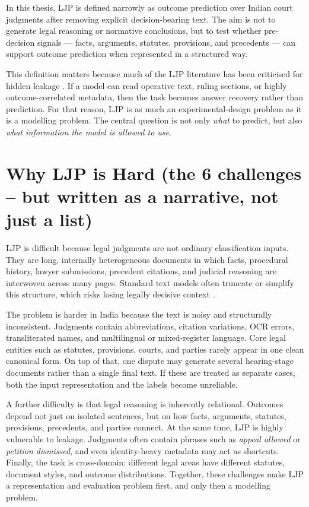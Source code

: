In this thesis, LJP is defined narrowly as outcome prediction over Indian court judgments after removing explicit decision-bearing text. The aim is not to generate legal reasoning or normative conclusions, but to test whether pre-decision signals --- facts, arguments, statutes, provisions, and precedents --- can support outcome prediction when represented in a structured way.

This definition matters because much of the LJP literature has been criticised for hidden leakage \cite{medvedeva2023doitright}. If a model can read operative text, ruling sections, or highly outcome-correlated metadata, then the task becomes answer recovery rather than prediction. For that reason, LJP is as much an experimental-design problem as it is a modelling problem. The central question is not only \emph{what} to predict, but also \emph{what information the model is allowed to use}. 

\section{Why LJP is Hard (the 6 challenges -- but written as a narrative, not just a list)}

LJP is difficult because legal judgments are not ordinary classification inputs. They are long, internally heterogeneous documents in which facts, procedural history, lawyer submissions, precedent citations, and judicial reasoning are interwoven across many pages. Standard text models often truncate or simplify this structure, which risks losing legally decisive context \cite{chalkidis2020legalbert, mamakas2022longlegal}.

The problem is harder in India because the text is noisy and structurally inconsistent. Judgments contain abbreviations, citation variations, OCR errors, transliterated names, and multilingual or mixed-register language. Core legal entities such as statutes, provisions, courts, and parties rarely appear in one clean canonical form. On top of that, one dispute may generate several hearing-stage documents rather than a single final text. If these are treated as separate cases, both the input representation and the labels become unreliable.

A further difficulty is that legal reasoning is inherently relational. Outcomes depend not just on isolated sentences, but on how facts, arguments, statutes, provisions, precedents, and parties connect. At the same time, LJP is highly vulnerable to leakage. Judgments often contain phrases such as \emph{appeal allowed} or \emph{petition dismissed}, and even identity-heavy metadata may act as shortcuts. Finally, the task is cross-domain: different legal areas have different statutes, document styles, and outcome distributions. Together, these challenges make LJP a representation and evaluation problem first, and only then a modelling problem.

